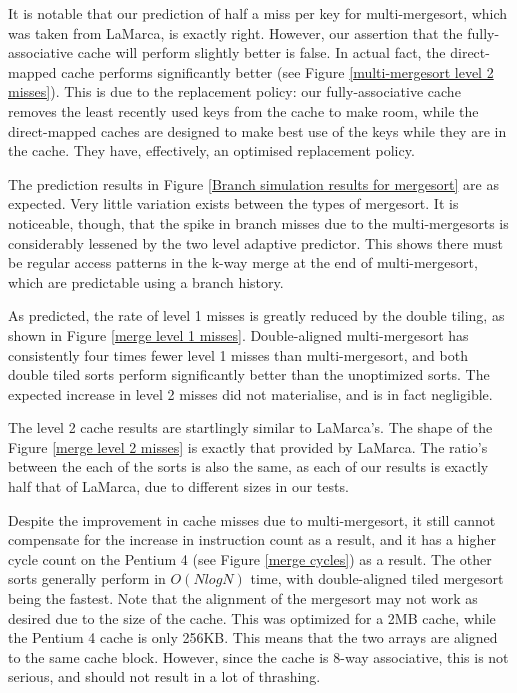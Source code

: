 \label{mergesort replacement policy}
It is notable that our prediction of half a miss per key for multi-mergesort,
which was taken from LaMarca, is exactly right. However, our assertion that the
fully-associative cache will perform slightly better is false. In actual fact,
the direct-mapped cache performs significantly better (see Figure
\vref{multi-mergesort level 2 misses}). This is due to the replacement policy:
our fully-associative cache removes the least recently used keys from the cache
to make room, while the direct-mapped caches are designed to make best use of
the keys while they are in the cache. They have, effectively, an optimised
replacement policy.

The prediction results in Figure \ref{Branch simulation results for mergesort}
are as expected. Very little variation exists between the types of mergesort. It
is noticeable, though, that the spike in branch misses due to the
multi-mergesorts is considerably lessened by the two level adaptive predictor.
This shows there must be regular access patterns in the k-way merge at the end
of multi-mergesort, which are predictable using a branch history.

As predicted, the rate of level 1 misses is greatly reduced by the double
tiling, as shown in Figure \ref{merge level 1 misses}. Double-aligned multi-mergesort
has consistently four times fewer level 1 misses than multi-mergesort, and both
double tiled sorts perform significantly better than the unoptimized sorts. The
expected increase in level 2 misses did not materialise, and is in fact
negligible.

The level 2 cache results are startlingly similar to LaMarca's. The shape of the
Figure \ref{merge level 2 misses} is exactly that provided by LaMarca. The
ratio's between the each of the sorts is also the same, as each of our results
is exactly half that of LaMarca, due to different  sizes in our tests.

Despite the improvement in cache misses due to multi-mergesort, it still cannot
compensate for the increase in instruction count as a result, and it has a higher
cycle count on the Pentium 4 (see Figure \ref{merge cycles}) as a result. The
other sorts generally perform in $O(NlogN)$ time, with double-aligned tiled mergesort
being the fastest. Note that the alignment of the mergesort may not work as
desired due to the size of the cache. This was optimized for a 2MB cache, while
the Pentium 4 cache is only 256KB. This means that the two arrays are aligned to
the same cache block. However, since the cache is 8-way associative, this is not
serious, and should not result in a lot of thrashing.

